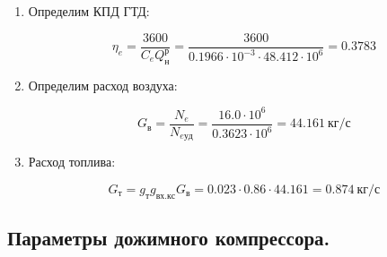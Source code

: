\documentclass[a4paper,12pt]{article}
\begin{document}
\begin{enumerate}
	\item Определим КПД ГТД:
	
	\[
	\eta_e = \frac{ 3600 }{ C_e Q_н^р } = 
			\frac{ 3600 }{ 0.1966 \cdot 10^{-3} \cdot 48.412 \cdot 10^6} 
	= 0.3783
	\]
	
	\item Определим расход воздуха:
	
	\[
	G_в = \frac{N_e}{N_{e уд} } = 
	\frac{ 16.0 \cdot 10^6 }{ 0.3623 \cdot 10^6 } = 
	44.161\ кг/с
	\]

	\item Расход топлива:

	\[
		G_{т} = g_т g_{вх.кс} G_в = 0.023 \cdot 0.86
		\cdot 44.161 =
		0.874\ кг/с
	\]

\end{enumerate}




    \subsection{Параметры дожимного компрессора.}
\end{document}
